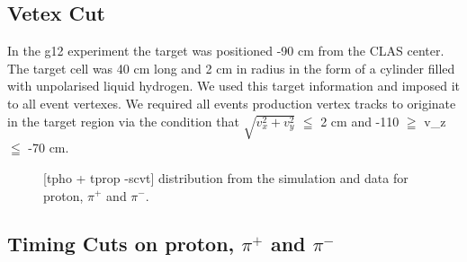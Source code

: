 \documentclass[12pt,a4paper]{amsbook}
\theoremstyle{definition}
\begin{document}
\subsection{Vetex Cut}

In the g12 experiment the target was positioned -90 cm from the CLAS center. The target cell was 40 cm long and 2 cm in radius in the form of a cylinder filled with unpolarised liquid hydrogen. We used this target information and imposed it to all event vertexes. We required all events  production vertex tracks to originate in the target region via the condition that $\sqrt{v_{x}^{2} + v_{y}^{2}}$ $\leqq$ 2 cm and -110 $\geqq$ v_{z} $\leqq$ -70 cm. 

\begin{figure}[ht!]
\centerline{
}
\caption{[tpho + tprop -scvt] distribution from the simulation and data for proton, $\pi^{+}$ and $\pi^{-}$.}
\label{Fig1}
\end{figure}

\subsection{Timing Cuts on proton, $\pi^{+}$ and $\pi^{-}$}
\end{document}
